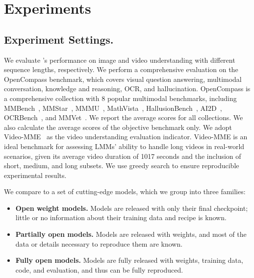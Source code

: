 

\section{Experiments}


\subsection{Experiment Settings.}

%
We evaluate \OurMethod’s performance on image and video understanding with different sequence lengths, respectively.
%
We perform a comprehensive evaluation on the OpenCompass benchmark, which covers visual question answering, multimodal conversation, knowledge and reasoning, OCR, and hallucination.
%
OpenCompass is a comprehensive collection with $8$ popular multimodal benchmarks, including MMBench~\cite{MMBench}, MMStar~\cite{MMStar}, MMMU~\cite{MMMU}, MathVista~\cite{MathVista}, HallusionBench~\cite{HallusionBench}, AI2D~\cite{AI2D}, OCRBench~\cite{OCRBench}, and MMVet~\cite{MMVet}.
%
We report the average scores for all collections.
%
We also calculate the average scores of the objective benchmark only.
%
We adopt Video-MME~\cite{Video-MME} as the video understanding evaluation indicator.
%
Video-MME is an ideal benchmark for assessing LMMs’ ability to handle long videos in real-world scenarios, given its average video duration of 1017 seconds and the inclusion of short, medium, and long subsets.
%
We use greedy search to ensure reproducible experimental results.
%


%
We compare \OurMethod to a set of cutting-edge models, which we group into three families:
%
\begin{itemize}[leftmargin=2.0em]
    \item
    \textbf{Open weight models.}
    Models are released with only their final checkpoint; little or no information about their training data and recipe is known.
    
    \item
    \textbf{Partially open models.}
    Models are released with weights, and most of the data or details necessary to reproduce them are known.

    \item
    \textbf{Fully open models.}
    Models are fully released with weights, training data, code, and evaluation, and thus can be fully reproduced.
    
\end{itemize}


